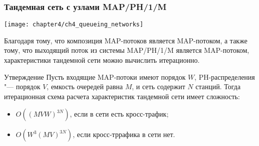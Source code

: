 
\begin{frame}
    \frametitle{Тандемная сеть с узлами MAP/PH/1/M}
    \begin{center}
        \texttt{[image: chapter4/ch4\_queueing\_networks]}
    \end{center}
    \footnotesize
    Благодаря тому, что композиция MAP-потоков является MAP-потоком, а также тому, что выходящий поток из системы MAP/PH/1/M является MAP-потоком, характеристики тандемной сети можно вычислить итерационно.

    \begin{exampleblock}{Утверждение}
        Пусть входящие MAP-потоки имеют порядок $W$, PH-распределения "--- порядок $V$, емкость очередей равна $M$, и сеть содержит $N$ станций. Тогда итерационная схема расчета характеристик тандемной сети имеет сложность:
        \begin{itemize}
            \item $O((M V W)^{3N})$, если в сети есть кросс-трафик;
            \item $O(W^3 (M V)^{3N})$, если кросс-тррафика в сети нет.
        \end{itemize}
    \end{exampleblock}
\end{frame}

